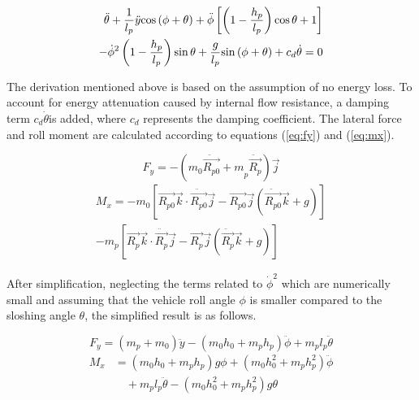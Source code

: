 \vspace{-0.3cm}
\begin{equation}
\begin{split}
\Ddot{\theta} + \frac{1}{l_{p}}\Ddot{y}{\cos\left( {\phi + \theta} \right)} + \ddot{\phi}\left\lbrack {\left( {1 - \frac{h_{p}}{l_{p}}} \right){\cos\theta} + 1} \right\rbrack \\
- {\dot{\phi}}^{2}\left( {1 - \frac{h_{p}}{l_{p}}} \right){\sin\theta} + \frac{g}{l_{p}}{\sin\left( {\phi + \theta} \right)} + c_{d}\dot{\theta} = 0
\label{eq:lsp_dyn}
\end{split}
\end{equation}
\vspace{-0.3cm}

The derivation mentioned above is based on the assumption of no energy loss. To account for energy attenuation caused by internal flow resistance, a damping term $c_d\dot{\theta}$is added, where $c_d$ represents the damping coefficient. The lateral force and roll moment are calculated according to equations (\ref{eq:fy}) and (\ref{eq:mx}).

\vspace{-0.3cm}
\begin{equation}
F_{y} = - \left( {m_{0}\ddot{\vec{R_{p0}}} + m}_{p}\ddot{\vec{R_{p}}} \right)\vec{j}
\label{eq:fy}
\end{equation}
\vspace{-0.3cm}
\begin{equation}
\begin{split}
M_{x} = - m_{0}\left\lbrack {\vec{R_{p0}}\vec{k} \cdot \ddot{\vec{R_{p0}}}\vec{j} - \vec{R_{p0}}\vec{j}\left( {\ddot{\vec{R_{p0}}}\vec{k} + g} \right)} \right\rbrack
\\
- m_{p}\left\lbrack {\vec{R_{p}}\vec{k} \cdot \ddot{\vec{R_{p}}}\vec{j} - \vec{R_{p}}\vec{j}\left( {\ddot{\vec{R_{p}}}\vec{k} + g} \right)} \right\rbrack
\end{split}
\label{eq:mx}
\end{equation}
\vspace{-0.3cm}

After simplification, neglecting the terms related to $\dot{\phi}^2$ which are numerically small and assuming that the vehicle roll angle $\phi$ is smaller compared to the sloshing angle $\theta$, the simplified result is as follows.

\vspace{-0.5cm}
\begin{equation}
F_y = \left( m_p + m_0 \right) \ddot{y} - \left( m_0 h_0 + m_p h_p \right) \ddot{\phi} + m_p l_p \ddot{\theta}
\label{eq:fy_simple}
\end{equation}
\vspace{-0.3cm}
\begin{equation}
\begin{split}
M_x &= \left( m_0 h_0 + m_p h_p \right) g \phi + \left( m_0 h_0^2 + m_p h_p^2 \right) \ddot{\phi} \\
&\quad + m_p l_p \ddot{\theta} - \left( m_0 h_0^2 + m_p h_p^2 \right) g \theta
\end{split}
\label{eq:mx_simple}
\end{equation}
\vspace{-0.3cm}


